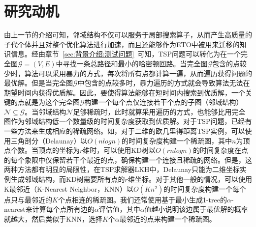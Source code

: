 \section{研究动机}
\label{sec:NS_Method:研究动机}
由上一节的介绍可知，邻域结构不仅可以服务于局部搜索算子，从而产生高质量的子代个体并且对整个优化算法进行加速，而且还能够作为ETO中被用来迁移的知识信息。经由章节~\ref{sec:背景介绍:测试问题}~可知，TSP问题可以转化为在一个完全图$\mathcal{G} = (V,E)$中寻找一条总路径和最小的哈密顿回路。当完全图$\mathcal{G}$包含的点较少时，算法可以采用暴力的方式，每次将所有点都计算一遍，从而遍历获得问题的最优解。但是当完全图$\mathcal{G}$中包含的点较多时，暴力遍历的方式就会导致算法无法在期望时间内获得优质解。因此，要使得算法能够在短时间内搜索到优质解，一个关键的点就是为这个完全图$\mathcal{G}$构建一个每个点仅连接若干个点的子图（邻域结构）$\mathcal{N} \subseteq \mathcal{G}$。当邻域结构$\mathcal{N}$足够稀疏时，此时就算采用遍历的方式，也能够比用完全图作为邻域结构低一个数量级的时间复杂度获取到优质解。对于TSP问题，已经有一些方法来生成相应的稀疏网络。如，对于二维的欧几里得距离TSP实例，可以使用三角剖分（Delaunay\cite{krasnogor1995new}）以$O(nlogn)$的时间复杂度构建一个稀疏图，其中$n$为顶点个数。当顶点的坐标为$r$维时，可以使用KD树\cite{bentley1975multidimensional}以$O(rnlogn)$的时间复杂度在点的每个象限中仅保留若干个最近的点，确保构建一个连接且稀疏的网络。但是，这两种方法都有明显的局限性，在TSP求解器LKH\cite{helsgaun2000effective,helsgaun2009general}中，Delaunay只能为二维坐标实例生成邻域结构，而KD树需要所有点的$r$维坐标。对于其他一般的情况，可以使用K最邻近（K-Nearest Neighbor，KNN）以$O(Kn^2)$的时间复杂度构建一个每个点只与最邻近的$K$个点相连的稀疏图。我们还常使用基于最小生成1-tree\cite{held1970traveling,held1971traveling}的$\alpha$-nearest来计算每个点所有边的$\alpha$评估值，其中$\alpha$值越小说明该边属于最优解的概率就越大，然后类似于KNN，选择$K$个$\alpha$最邻近的点来构建一个稀疏图。
